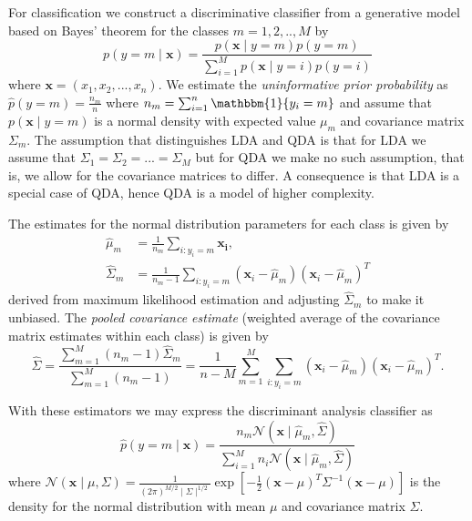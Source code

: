 \documentclass[../../project.tex]{subfiles}
\begin{document}
	For classification we construct a discriminative classifier from a generative model based on Bayes' theorem for the classes $m=1,2,..,M$ by
	\begin{equation}
	p(y=m \mid \boldsymbol{x}) = \frac{ p(\boldsymbol{x} \mid y=m) p(y=m)}
	{\sum_{i=1}^{M} p(\boldsymbol{x} \mid y=i)p(y=i)}
	\end{equation}
	where $\boldsymbol{x}=(x_1,x_2,...,x_n)$. We estimate the \textit{uninformative prior probability} as $\hat{p}(y=m) = \frac{n_m}{n}$ where $n_m = \sum_{i=1}^{n} \mathbbm{1}\{y_i=m\}$ and assume that $p(\boldsymbol{x} \mid y=m)$ is a normal density with expected value $\mu_m$ and covariance matrix $\Sigma_m$. The assumption that distinguishes LDA and QDA is that for LDA we assume that $\Sigma_1=\Sigma_2=...=\Sigma_M$ but for QDA we make no such assumption, that is, we allow for the covariance matrices to differ. A consequence is that LDA is a special case of QDA, hence QDA is a model of higher complexity. 
	
	The estimates for the normal distribution parameters for each class is given by
	\begin{align}
	\hat{\mu}_m &= \frac{1}{n_m} \sum_{i:y_i=m} \boldsymbol{x_i}, \\
	\hat{\Sigma}_m &= \frac{1}{n_m-1}\sum_{i:y_i=m} (\boldsymbol{x}_i-\hat{\mu}_m)(\boldsymbol{x}_i-\hat{\mu}_m)^T
	\end{align}
	derived from maximum likelihood estimation and adjusting $\hat{\Sigma}_m$ to make it unbiased. The \textit{pooled covariance estimate} (weighted average of the covariance matrix estimates within each class) is given by
	\begin{equation}
	\hat{\Sigma} = \frac{\sum_{m=1}^{M} (n_m-1)\hat{\Sigma}_m}{\sum_{m=1}^{M} (n_m-1)}=\frac{1}{n-M}\sum_{m=1}^{M}\sum_{i:y_i=m} (\boldsymbol{x}_i-\hat{\mu}_m)(\boldsymbol{x}_i-\hat{\mu}_m)^T.
	\end{equation}
	
	With these estimators we may express the discriminant analysis classifier as
	\begin{equation}
	\hat{p}(y=m \mid \boldsymbol{x}) = \frac{n_m\mathcal{N}(\boldsymbol{x} \mid \hat{\mu}_m, \hat{\Sigma})}{\sum_{i=1}^{M} n_i\mathcal{N}(\boldsymbol{x} \mid \hat{\mu}_m, \hat{\Sigma})}
	\end{equation}
	where $\mathcal{N}(\boldsymbol{x} \mid \mu,\Sigma)=\frac{1}{(2\pi)^{M/2}\mid\Sigma\mid^{1/2}}\exp{[-\frac{1}{2}(\boldsymbol{x}-\mu)^T\Sigma^{-1}(\boldsymbol{x}-\mu)]}$ is the density for the normal distribution with mean $\mu$ and covariance matrix $\Sigma$.
\end{document}
